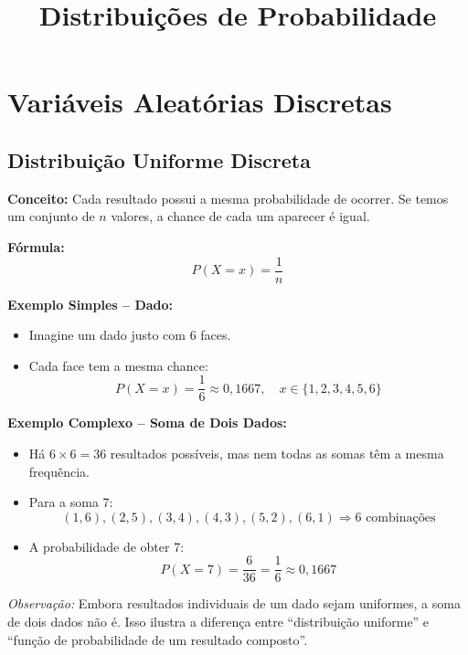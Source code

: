 \documentclass[a4paper,12pt]{article}
\title{Distribuições de Probabilidade}
\author{}
\date{}
\begin{document}
\maketitle

\section{Variáveis Aleatórias Discretas}

\subsection{Distribuição Uniforme Discreta}

\textbf{Conceito:} Cada resultado possui a mesma probabilidade de ocorrer. Se temos um conjunto de \( n \) valores, a chance de cada um aparecer é igual.

\textbf{Fórmula:}
\begin{equation}
P(X = x) = \frac{1}{n}
\end{equation}

\textbf{Exemplo Simples – Dado:}
\begin{itemize}
    \item Imagine um dado justo com 6 faces.
    \item Cada face tem a mesma chance:
    \begin{equation}
    P(X = x) = \frac{1}{6} \approx 0{,}1667, \quad x \in \{1,2,3,4,5,6\}
    \end{equation}
\end{itemize}

\textbf{Exemplo Complexo – Soma de Dois Dados:}
\begin{itemize}
    \item Há \( 6 \times 6 = 36 \) resultados possíveis, mas nem todas as somas têm a mesma frequência.
    \item Para a soma 7:
    \[
    (1,6), (2,5), (3,4), (4,3), (5,2), (6,1) \Rightarrow 6 \text{ combinações}
    \]
    \item A probabilidade de obter 7:
    \begin{equation}
    P(X = 7) = \frac{6}{36} = \frac{1}{6} \approx 0{,}1667
    \end{equation}
\end{itemize}

\textit{Observação:} Embora resultados individuais de um dado sejam uniformes, a soma de dois dados não é. Isso ilustra a diferença entre “distribuição uniforme” e “função de probabilidade de um resultado composto”.
\end{document}
